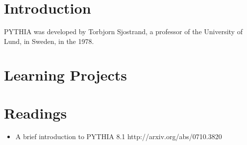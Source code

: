 \section{Introduction}
PYTHIA was developed by Torbjorn Sjostrand, a professor of the University of Lund, in Sweden, in the 1978.


\section{Learning Projects}


\section{Readings}
\begin{itemize}
  \item A brief introduction to PYTHIA 8.1 http://arxiv.org/abs/0710.3820
\end{itemize}
